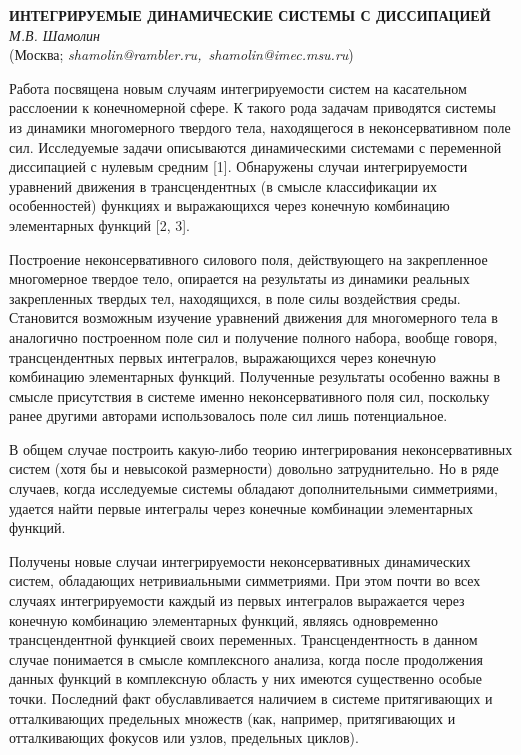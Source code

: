 \begin{center}{ \bf  ИНТЕГРИРУЕМЫЕ ДИНАМИЧЕСКИЕ СИСТЕМЫ С ДИССИПАЦИЕЙ}\\
{\it М.В. Шамолин } \\
(Москва; {\it shamolin@rambler.ru,~shamolin@imec.msu.ru})
\end{center}

Работа посвящена новым случаям интегрируемости систем на касательном
расслоении к конечномерной сфере. К такого рода задачам приводятся
системы из динамики многомерного твердого тела, находящегося в
неконсервативном поле сил. Исследуемые задачи описываются
динамическими системами с переменной диссипацией с нулевым средним
[1]. Обнаружены случаи интегрируемости уравнений движения в
трансцендентных (в смысле классификации их особенностей) функциях и
выражающихся через конечную комбинацию элементарных функций [2, 3].

Построение неконсервативного силового поля, действующего на
закрепленное многомерное твердое тело, опирается на результаты из
динамики реальных закрепленных твердых тел, находящихся, в поле силы
воздействия среды. Становится возможным изучение уравнений движения
для многомерного тела в аналогично построенном поле сил и получение
полного набора, вообще говоря, трансцендентных первых интегралов,
выражающихся через конечную комбинацию элементарных функций.
Полученные результаты особенно важны в смысле присутствия в системе
именно неконсервативного поля сил, поскольку ранее другими авторами
использовалось поле сил лишь потенциальное.



В общем случае построить какую-либо теорию интегрирования
неконсервативных систем (хотя бы и невысокой размерности) довольно
затруднительно. Но в ряде случаев, когда исследуемые системы
обладают дополнительными симметриями, удается найти первые интегралы
через конечные комбинации элементарных функций.

Получены новые случаи интегрируемости неконсервативных динамических
систем, обладающих нетривиальными симметриями. При этом почти во
всех случаях интегрируемости каждый из первых интегралов выражается
через конечную комбинацию элементарных функций, являясь одновременно
трансцендентной функцией своих переменных. Трансцендентность в
данном случае понимается в смысле комплексного анализа, когда после
продолжения данных функций в комплексную область у них имеются
существенно особые точки. Последний факт обуславливается наличием в
системе притягивающих и отталкивающих предельных множеств (как,
например, притягивающих и отталкивающих фокусов или узлов,
предельных циклов).



